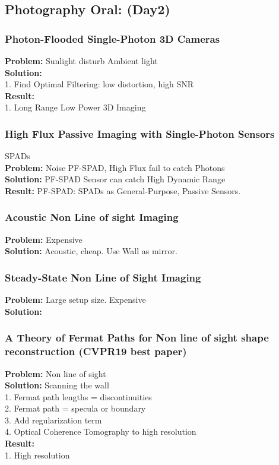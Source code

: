 \subsection{Photography Oral: (Day2)}
\subsubsection{Photon-Flooded Single-Photon 3D Cameras}
    {\bf Problem:} Sunlight disturb Ambient light \\
    {\bf Solution:}  \\
        1. Find Optimal Filtering: low distortion, high SNR \\
    {\bf Result:} \\
        1. Long Range Low Power 3D Imaging \\
\subsubsection{High Flux Passive Imaging with Single-Photon Sensors}
    SPADs \\
    {\bf Problem:} Noise PF-SPAD, High Flux fail to catch Photons \\
    {\bf Solution:} PF-SPAD Sensor can catch High Dynamic Range \\
    {\bf Result:} PF-SPAD: SPADs as General-Purpose, Passive Sensors. \\
\subsubsection{Acoustic Non Line of sight Imaging}
    {\bf Problem:} Expensive \\
    {\bf Solution:} Acoustic, cheap. Use Wall as mirror. \\
\subsubsection{Steady-State Non Line of Sight Imaging}
    {\bf Problem:} Large setup size. Expensive \\
    {\bf Solution:} \\
\subsubsection{A Theory of Fermat Paths for Non line of sight shape reconstruction (CVPR19 best paper)}
    {\bf Problem:} Non line of sight \\
    {\bf Solution:} Scanning the wall \\
        1. Fermat path lengths = discontinuities \\
        2. Fermat path = specula or boundary \\
        3. Add regularization term \\
        4. Optical Coherence Tomography to high resolution \\
    {\bf Result:}  \\
        1. High resolution \\

